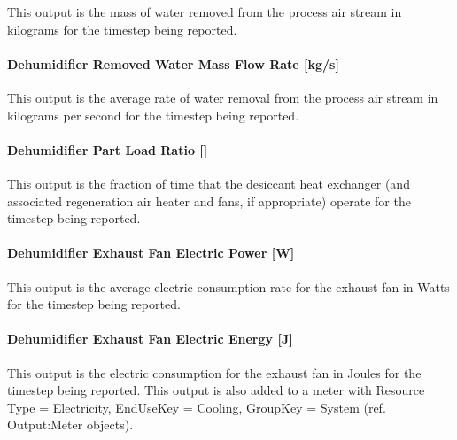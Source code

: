 This output is the mass of water removed from the process air stream in kilograms for the timestep being reported.

\paragraph{Dehumidifier Removed Water Mass Flow Rate {[}kg/s{]}}\label{dehumidifier-removed-water-mass-flow-rate-kgs-1}

This output is the average rate of water removal from the process air stream in kilograms per second for the timestep being reported.

\paragraph{Dehumidifier Part Load Ratio {[]}}\label{dehumidifier-part-load-ratio-1}

This output is the fraction of time that the desiccant heat exchanger (and associated regeneration air heater and fans, if appropriate) operate for the timestep being reported.

\paragraph{Dehumidifier Exhaust Fan Electric Power {[}W{]}}\label{dehumidifier-exhaust-fan-electric-power-w}

This output is the average electric consumption rate for the exhaust fan in Watts for the timestep being reported.

\paragraph{Dehumidifier Exhaust Fan Electric Energy {[}J{]}}\label{dehumidifier-exhaust-fan-electric-energy-j}

This output is the electric consumption for the exhaust fan in Joules for the timestep being reported. This output is also added to a meter with Resource Type = Electricity, EndUseKey = Cooling, GroupKey = System (ref. Output:Meter objects).